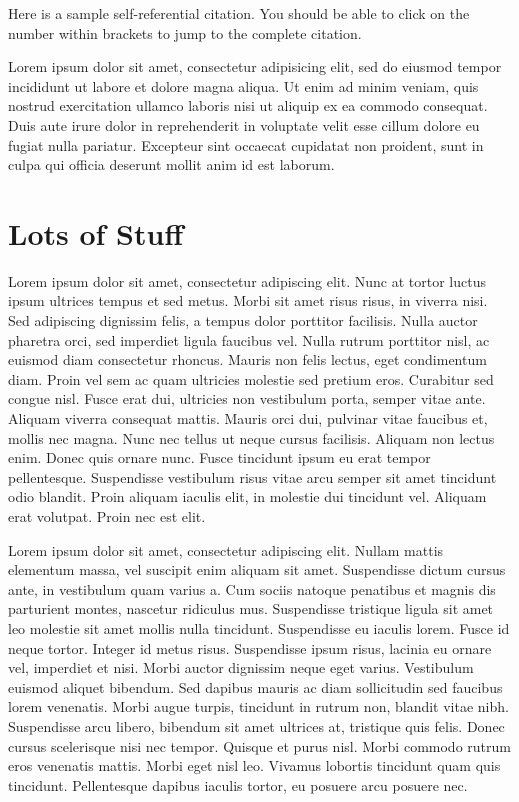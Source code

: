 \documentclass{chi-ext}
\begin{document}
\begin{multicols}{2}
Here \cite{chi_extended_template} is a sample self-referential citation. You should be able to click
on the number within brackets to jump to the complete citation.

Lorem ipsum dolor sit amet, consectetur adipisicing elit, sed do eiusmod tempor incididunt ut labore
et dolore magna aliqua. Ut enim ad minim veniam, quis nostrud exercitation ullamco laboris nisi ut
aliquip ex ea commodo consequat. Duis aute irure dolor in reprehenderit in voluptate velit esse
cillum dolore eu fugiat nulla pariatur. Excepteur sint occaecat cupidatat non proident, sunt in
culpa qui officia deserunt mollit anim id est laborum.

\section{Lots of Stuff}

Lorem ipsum dolor sit amet, consectetur adipiscing elit. Nunc at tortor luctus ipsum ultrices tempus
et sed metus. Morbi sit amet risus risus, in viverra nisi. Sed adipiscing dignissim felis, a tempus
dolor porttitor facilisis. Nulla auctor pharetra orci, sed imperdiet ligula faucibus vel. Nulla
rutrum porttitor nisl, ac euismod diam consectetur rhoncus. Mauris non felis lectus, eget
condimentum diam. Proin vel sem ac quam ultricies molestie sed pretium eros. Curabitur sed congue
nisl. Fusce erat dui, ultricies non vestibulum porta, semper vitae ante. Aliquam viverra consequat
mattis. Mauris orci dui, pulvinar vitae faucibus et, mollis nec magna. Nunc nec tellus ut neque
cursus facilisis. Aliquam non lectus enim. Donec quis ornare nunc. Fusce tincidunt ipsum eu erat
tempor pellentesque. Suspendisse vestibulum risus vitae arcu semper sit amet tincidunt odio blandit.
Proin aliquam iaculis elit, in molestie dui tincidunt vel. Aliquam erat volutpat. Proin nec est
elit.

Lorem ipsum dolor sit amet, consectetur adipiscing elit. Nullam mattis elementum massa, vel suscipit
enim aliquam sit amet. Suspendisse dictum cursus ante, in vestibulum quam varius a. Cum sociis
natoque penatibus et magnis dis parturient montes, nascetur ridiculus mus. Suspendisse tristique
ligula sit amet leo molestie sit amet mollis nulla tincidunt. Suspendisse eu iaculis lorem. Fusce id
neque tortor. Integer id metus risus. Suspendisse ipsum risus, lacinia eu ornare vel, imperdiet et
nisi. Morbi auctor dignissim neque eget varius. Vestibulum euismod aliquet bibendum. Sed dapibus
mauris ac diam sollicitudin sed faucibus lorem venenatis. Morbi augue turpis, tincidunt in rutrum
non, blandit vitae nibh. Suspendisse arcu libero, bibendum sit amet ultrices at, tristique quis
felis. Donec cursus scelerisque nisi nec tempor. Quisque et purus nisl. Morbi commodo rutrum eros
venenatis mattis. Morbi eget nisl leo. Vivamus lobortis tincidunt quam quis tincidunt. Pellentesque
dapibus iaculis tortor, eu posuere arcu posuere nec.


\end{multicols}
\end{document}
